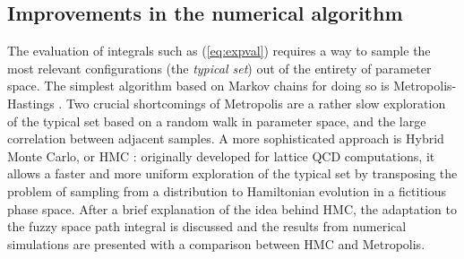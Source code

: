 \subsection{Improvements in the numerical algorithm}\label{numimprov}
The evaluation of integrals such as (\ref{eq:expval}) requires a way to sample the most relevant configurations (the \textit{typical set}) out of the entirety of parameter space. The simplest algorithm based on Markov chains for doing so is Metropolis-Hastings \cite{hastings}. Two crucial shortcomings of Metropolis are a rather slow exploration of the typical set based on a random walk in parameter space, and the large correlation between adjacent samples. A more sophisticated approach is Hybrid Monte Carlo, or HMC \cite{duane}: originally developed for lattice QCD computations, it allows a faster and more uniform exploration of the typical set by transposing the problem of sampling from a distribution to Hamiltonian evolution in a fictitious phase space.\newline
After a brief explanation of the idea behind HMC, the adaptation to the fuzzy space path integral is discussed and the results from numerical simulations are presented with a comparison between HMC and Metropolis.

